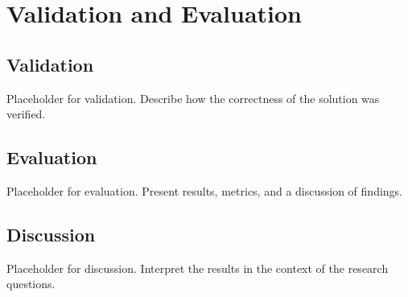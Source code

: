 \chapter{Validation and Evaluation}

\section{Validation}
Placeholder for validation. Describe how the correctness of the solution was verified.

\section{Evaluation}
Placeholder for evaluation. Present results, metrics, and a discussion of findings.

\section{Discussion}
Placeholder for discussion. Interpret the results in the context of the research questions.
